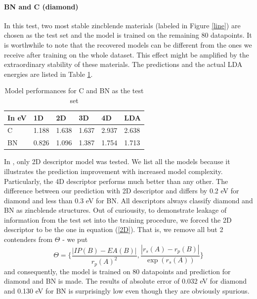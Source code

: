 \documentclass[11pt,oneside,czech,american]{book} %
\theoremstyle{plain}
\theoremstyle{definition}
\begin{document}
\paragraph{BN and C (diamond)}
In this test, two most stable zincblende materials (labeled in Figure \ref{line}) are chosen as the test set and the model is trained on the remaining 80 datapoints. It is worthwhile to note that the recovered models can be different from the ones we receive after training on the whole dataset. This effect might be amplified by the extraordinary stability of these materials. The predictions and the actual LDA energies are listed in Table \ref{C_BN}.
\begin{table}[H]
	\centering
	\begin{tabular}{llllll} 
		\hline
		In eV & 1D    & 2D    & 3D    & 4D    & LDA    \\ 
		\hline
		C     & 1.188 & 1.638 & 1.637 & 2.937 & 2.638  \\ 		
		BN    & 0.826 & 1.096 & 1.387 & 1.754 & 1.713  \\
		\hline
	\end{tabular}
	\caption{Model performances for C and BN as the test set}
	\label{C_BN}
\end{table}
In \parencite{ghiringhelli17}, only 2D descriptor model was tested. We list all the models because it illustrates the prediction improvement with increased model complexity. Particularly, the 4D descriptor performs much better than any other. The difference between our prediction with 2D descriptor and \parencite{ghiringhelli17} differs by 0.2 eV for diamond and less than 0.3 eV for BN. All descriptors always classify diamond and BN as zincblende structures.
Out of curiousity, to demonstrate leakage of information from the test set into the training procedure, we forced the 2D descriptor to be the one in equation (\ref{2D}). That is, we remove all but 2 contenders from $\Theta$ - we put $$\Theta = \Big\{ \frac{|IP(B)-EA(B)|}{r_p(A)^2}, \frac{|r_s(A)-r_p(B)|}{\exp(r_s(A))} \Big\}$$ and consequently, the model is trained on 80 datapoints and prediction for diamond and BN is made. The results of absolute error of 0.032 eV for diamond and 0.130 eV for BN is surprisingly low even though they are obviously spurious.
\end{document}

